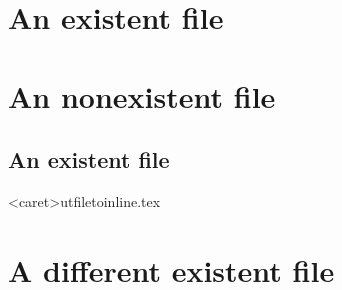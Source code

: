 \section{An existent file}


\section{An nonexistent file}


\subsection{An existent file}
\inp<caret>ut{filetoinline.tex}

\section{A different existent file}


